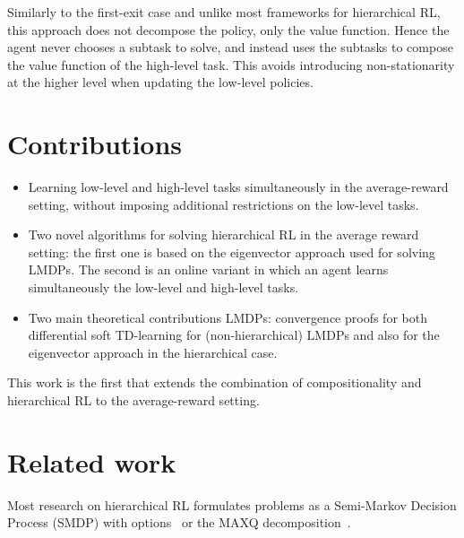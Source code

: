 Similarly to the first-exit case and unlike most frameworks for hierarchical RL, this approach does not decompose the policy, only the value function. Hence the agent never chooses a subtask to solve, and instead uses the subtasks to compose the value function of the high-level task. 
This avoids introducing non-stationarity at the higher level when updating the low-level policies.

\section{Contributions}
\begin{itemize}
  \item Learning low-level and high-level tasks simultaneously in the average-reward setting, without imposing additional restrictions on the low-level tasks.
    \item Two novel algorithms for solving hierarchical RL in the average reward setting: the first one is based on the eigenvector approach used for solving LMDPs. The second is an online variant in which an agent learns simultaneously the low-level and high-level tasks.
    \item Two main theoretical contributions LMDPs: convergence proofs for both differential soft TD-learning for (non-hierarchical) LMDPs and also for the eigenvector approach in the hierarchical case.
\end{itemize}

This work is the first that extends the combination of compositionality and hierarchical RL to the average-reward setting.

\section{Related work}
Most research on hierarchical RL formulates problems as a Semi-Markov Decision Process (SMDP) with options~\citep{Sutton1999} or the MAXQ decomposition~\citep{Dietterich2000}.

